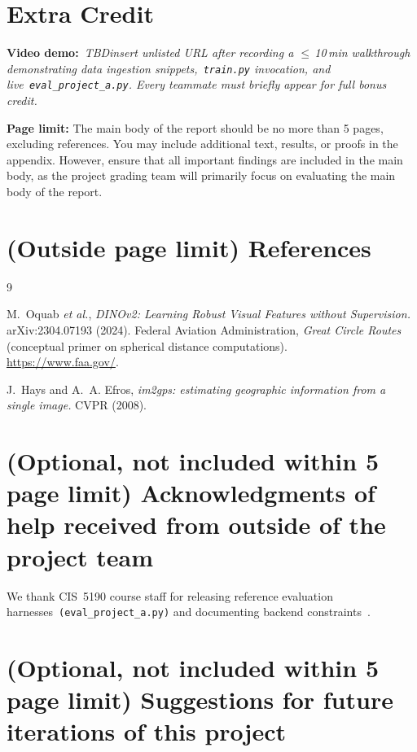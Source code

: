 \documentclass[10pt]{article}
\begin{document}
\section{Extra Credit}

\textbf{Video demo:}\ \emph{TBD\textemdash insert unlisted URL after recording a $\leq$\,10\,min walkthrough demonstrating data ingestion snippets,~\texttt{train.py} invocation, and live~\texttt{eval\_project\_a.py}. Every teammate must briefly appear for full bonus credit.}




\vspace{3em}
\noindent
{\bf Page limit:} The main body of the report should be no more than 5 pages, excluding references. You may include additional text, results, or proofs in the appendix. However, ensure that all important findings are included in the main body, as the project grading team will primarily focus on evaluating the main body of the report.

\section*{(Outside page limit) References}
\begin{thebibliography}{9}
\setlength{\itemsep}{2pt plus 1pt}

M.~Oquab \emph{et al.},
\textit{DINOv2: Learning Robust Visual Features without Supervision.}
arXiv:2304.07193 (2024).
Federal Aviation Administration,
\textit{Great Circle Routes} (conceptual primer on spherical distance computations).
\\\url{https://www.faa.gov/}.

J.~Hays and A.~A. Efros,
\textit{im2gps: estimating geographic information from a single image.}
CVPR (2008).
\end{thebibliography}

\section{(Optional, not included within 5 page limit) Acknowledgments of help received from outside of the project team}

We thank CIS~5190 course staff for releasing reference evaluation harnesses~\texttt{(eval\_project\_a.py)} and documenting backend constraints~\cite{faa_navigation}.

\section{(Optional, not included within 5 page limit) Suggestions for future iterations of this project}
\end{document}
